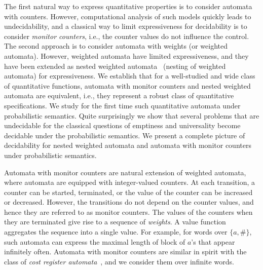 \documentclass{lmcs}
\begin{document}
\smallskip{}
The first natural way to express quantitative properties is to
consider automata with counters.
However, computational analysis of such models quickly leads to
undecidability, and a classical way to limit expressiveness for
decidability is to consider {\em monitor counters}, i.e.,
the counter values do not influence the control.
The second approach is to consider automata with weights
(or weighted automata).
However, weighted automata have limited expressiveness, and
they have been extended as nested weighted automata~\cite{nested}
(nesting of weighted automata) for expressiveness.
We establish that for a well-studied and wide class of quantitative
functions, automata with monitor counters and nested weighted
automata are equivalent, i.e., they represent a robust class of
quantitative specifications.
We study for the first time such quantitative automata under
probabilistic semantics.
Quite surprisingly we show that several problems that are undecidable
for the classical questions of emptiness and universality become
decidable under the probabilistic semantics.
We present a complete picture of decidability for nested weighted
automata and automata with monitor counters under probabilistic semantics.



\smallskip{}
Automata with monitor counters are natural extension of weighted automata, where
automata are equipped with integer-valued counters.
At each transition, a counter can be started, terminated, or the value
of the counter can be increased or decreased.
However, the transitions
do not depend on the counter values, and hence they are referred to as
monitor counters.
The values of the counters when they are terminated give rise to
a sequence of \emph{weights}.
A value function aggregates the sequence into a single value.
For example, for words over $\{a,\#\}$, such automata can express
the maximal length of block of $a$'s that appear infinitely often.
Automata with monitor counters are similar in spirit with the class
of \emph{cost register automata}~\cite{DBLP:conf/lics/AlurDDRY13}, and
we consider them over infinite words.
\end{document}
